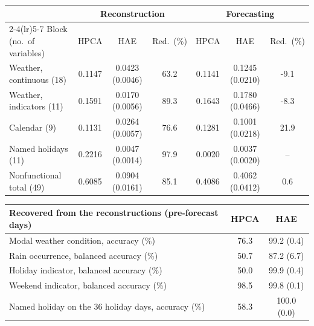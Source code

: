 \begin{tabular}{lcccccc}
\toprule
& \multicolumn{3}{c}{Reconstruction} & \multicolumn{3}{c}{Forecasting} \\
\cmidrule(lr){2-4}\cmidrule(lr){5-7}
Block (no.\ of variables) & HPCA & HAE & Red.\ (\%) & HPCA & HAE & Red.\ (\%) \\
\midrule
Weather, continuous (18) & 0.1147 & 0.0423 (0.0046) & 63.2 & 0.1141 & 0.1245 (0.0210) & -9.1 \\
Weather, indicators (11) & 0.1591 & 0.0170 (0.0056) & 89.3 & 0.1643 & 0.1780 (0.0466) & -8.3 \\
Calendar (9) & 0.1131 & 0.0264 (0.0057) & 76.6 & 0.1281 & 0.1001 (0.0218) & 21.9 \\
Named holidays (11) & 0.2216 & 0.0047 (0.0014) & 97.9 & 0.0020 & 0.0037 (0.0020) & -- \\
\midrule
Nonfunctional total (49) & 0.6085 & 0.0904 (0.0161) & 85.1 & 0.4086 & 0.4062 (0.0412) & 0.6 \\
\bottomrule
\end{tabular}

\medskip

\begin{tabular}{lcc}
\toprule
Recovered from the reconstructions (pre-forecast days) & HPCA & HAE \\
\midrule
Modal weather condition, accuracy (\%) & 76.3 & 99.2 (0.4) \\
Rain occurrence, balanced accuracy (\%) & 50.7 & 87.2 (6.7) \\
Holiday indicator, balanced accuracy (\%) & 50.0 & 99.9 (0.4) \\
Weekend indicator, balanced accuracy (\%) & 98.5 & 99.8 (0.1) \\
Named holiday on the 36 holiday days, accuracy (\%) & 58.3 & 100.0 (0.0) \\
\bottomrule
\end{tabular}
